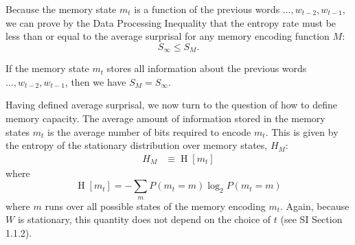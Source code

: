  Because the memory state $m_t$ is a function of the previous words $ \dots, w_{t-2}, w_{t-1}$, we can prove by the Data Processing Inequality \citep[][pp. 34--35]{cover2006elements} that the entropy rate must be less than or equal to the average surprisal for any memory encoding function $M$:
\begin{equation*}
    S_\infty \le S_M.
\end{equation*}


If the memory state $m_t$ stores all information about the previous words $ \dots, w_{t-2}, w_{t-1}$, then we have $S_M = S_\infty$.

Having defined average surprisal, we now turn to the question of how to define memory capacity. The average amount of information stored in the memory states $m_t$ is the average number of bits required to encode $m_t$. 
This is given by the entropy of the stationary distribution over memory states, $H_M$: %
\begin{align}
    \nonumber
        H_M &\equiv \operatorname{H}[m_t] 
\end{align}
where
\begin{equation*}
    \operatorname{H}[m_t] = - \sum_m P(m_t = m) \log_2 P(m_t=m)
\end{equation*}
where $m$ runs over all possible states of the memory encoding $m_t$.
Again, because $W$ is stationary, this quantity does not depend on the choice of $t$ (see SI Section 1.1.2). 

